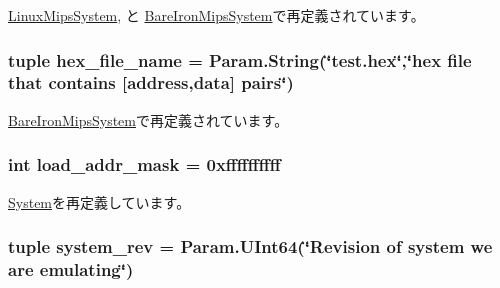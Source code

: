 \hyperlink{classMipsSystem_1_1LinuxMipsSystem_a17da7064bc5c518791f0c891eff05fda}{LinuxMipsSystem}, と \hyperlink{classMipsSystem_1_1BareIronMipsSystem_a17da7064bc5c518791f0c891eff05fda}{BareIronMipsSystem}で再定義されています。\hypertarget{classMipsSystem_1_1MipsSystem_a646616e47eba70e20cb5c35443d7bf4a}{
\subsubsection[{hex\_\-file\_\-name}]{\setlength{\rightskip}{0pt plus 5cm}tuple hex\_\-file\_\-name = Param.String(\char`\"{}test.hex\char`\"{},\char`\"{}hex file that contains \mbox{[}address,data\mbox{]} pairs\char`\"{})}}
\label{classMipsSystem_1_1MipsSystem_a646616e47eba70e20cb5c35443d7bf4a}


\hyperlink{classMipsSystem_1_1BareIronMipsSystem_a646616e47eba70e20cb5c35443d7bf4a}{BareIronMipsSystem}で再定義されています。\hypertarget{classMipsSystem_1_1MipsSystem_abd9c5cc6b7da624a69344d571bab1038}{
\subsubsection[{load\_\-addr\_\-mask}]{\setlength{\rightskip}{0pt plus 5cm}int load\_\-addr\_\-mask = 0xffffffffff}}
\label{classMipsSystem_1_1MipsSystem_abd9c5cc6b7da624a69344d571bab1038}


\hyperlink{classSystem_1_1System_ae97427a4073448718c4d7c3df3b53143}{System}を再定義しています。\hypertarget{classMipsSystem_1_1MipsSystem_a0f86e3835b8bf2135faf7b1bab968494}{
\subsubsection[{system\_\-rev}]{\setlength{\rightskip}{0pt plus 5cm}tuple system\_\-rev = Param.UInt64(\char`\"{}Revision of system we are emulating\char`\"{})}}
\label{classMipsSystem_1_1MipsSystem_a0f86e3835b8bf2135faf7b1bab968494}


